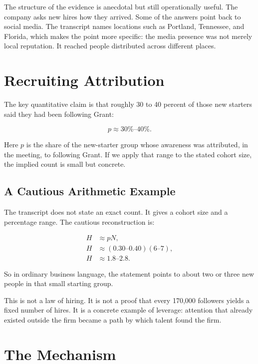 The structure of the evidence is anecdotal but still operationally useful. The company asks new hires how they arrived. Some of the answers point back to social media. The transcript names locations such as Portland, Tennessee, and Florida, which makes the point more specific: the media presence was not merely local reputation. It reached people distributed across different places.

\section{Recruiting Attribution}

The key quantitative claim is that roughly 30 to 40 percent of those new starters said they had been following Grant:

\begin{equation}
p \approx 30\%\text{--}40\%.
\end{equation}

Here \(p\) is the share of the new-starter group whose awareness was attributed, in the meeting, to following Grant. If we apply that range to the stated cohort size, the implied count is small but concrete.

\subsection{A Cautious Arithmetic Example}

The transcript does not state an exact count. It gives a cohort size and a percentage range. The cautious reconstruction is:

\begin{align}
H &\approx pN,\\
H &\approx (0.30\text{--}0.40)(6\text{--}7),\\
H &\approx 1.8\text{--}2.8.
\end{align}

So in ordinary business language, the statement points to about two or three new people in that small starting group.

This is not a law of hiring. It is not a proof that every 170,000 followers yields a fixed number of hires. It is a concrete example of leverage: attention that already existed outside the firm became a path by which talent found the firm.

\section{The Mechanism}

